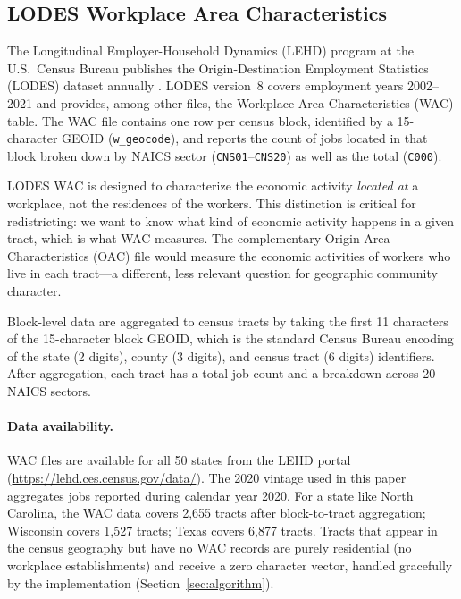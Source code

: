 \label{sec:background}

\subsection{LODES Workplace Area Characteristics}

The Longitudinal Employer-Household Dynamics (LEHD) program at the U.S.\
Census Bureau publishes the Origin-Destination Employment Statistics (LODES)
dataset annually \citep{abowd2009lodes}.
LODES version~8 covers employment years 2002--2021 and provides, among
other files, the Workplace Area Characteristics (WAC) table.
The WAC file contains one row per census block, identified by a
15-character GEOID (\texttt{w\_geocode}), and reports the count of jobs
located in that block broken down by NAICS sector (\texttt{CNS01}--\texttt{CNS20})
as well as the total (\texttt{C000}).

LODES WAC is designed to characterize the economic activity \emph{located at}
a workplace, not the residences of the workers.
This distinction is critical for redistricting: we want to know what kind of
economic activity happens in a given tract, which is what WAC measures.
The complementary Origin Area Characteristics (OAC) file would measure the
economic activities of workers who live in each tract---a different, less
relevant question for geographic community character.

Block-level data are aggregated to census tracts by taking the first 11
characters of the 15-character block GEOID, which is the standard
Census Bureau encoding of the state (2 digits), county (3 digits),
and census tract (6 digits) identifiers.
After aggregation, each tract has a total job count and a breakdown across
20 NAICS sectors.

\paragraph{Data availability.}
WAC files are available for all 50 states from the LEHD portal
(\url{https://lehd.ces.census.gov/data/}).
The 2020 vintage used in this paper aggregates jobs reported during
calendar year 2020.
For a state like North Carolina, the WAC data covers 2,655 tracts after
block-to-tract aggregation; Wisconsin covers 1,527 tracts; Texas covers
6,877 tracts.
Tracts that appear in the census geography but have no WAC records are
purely residential (no workplace establishments) and receive a zero
character vector, handled gracefully by the implementation
(Section~\ref{sec:algorithm}).

